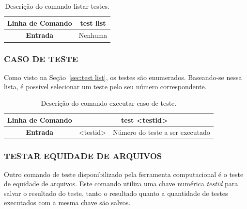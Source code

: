 \documentclass[a4paper,12pt]{monografia}
\theoremstyle{plain}
\theoremstyle{definition}
\theoremstyle{remark}
\begin{document}
\begin{center}
	\begin{table}[!htbp]
		\begin{tabular}{|c|m{}|}
			\hline
			\textbf{Linha de Comando} & \multicolumn{1}{c|}{test list} \\
			\hline
			\textbf{Entrada} & Nenhuma \\
			\hline
		\end{tabular}
	\caption{Descrição do comando listar testes.}
	\label{tab:list_test}
	\end{table}
\end{center}

\subsubsection{CASO DE TESTE}\label{sec:case list}

Como visto na Seção~\ref{sec:test list}, os testes são enumerados. Baseando-se nessa lista, é possível selecionar um teste pelo seu número correspondente.

\begin{center}
	\begin{table}[!htbp]
	\begin{tabular}{|c|c|m{}|}
		\hline
		\textbf{Linha de Comando} & \multicolumn{2}{c|}{test <test\underline{\space}id>} \\
		\hline
		\textbf{Entrada} & <test\underline{\space}id> & Número do teste a ser executado \\
		\hline
	\end{tabular}
	\caption{Descrição do comando executar caso de teste.}
	\label{tab:case_test}
	\end{table}
\end{center}

\subsubsection{TESTAR EQUIDADE DE ARQUIVOS}\label{sec:test_file}

Outro comando de teste disponibilizado pela ferramenta computacional é o teste de equidade de arquivos. Este comando utiliza uma chave numérica \textit{test\underline{\space}id} para salvar o resultado do teste, tanto o resultado quanto a quantidade de testes executados com a mesma chave são salvos.
\end{document}

